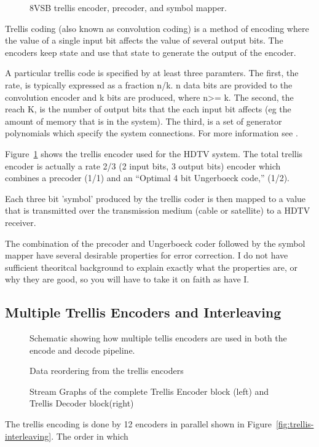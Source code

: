
\begin{figure}
\center
\epsfxsize=5.5in
\caption{8VSB trellis encoder, precoder, and symbol mapper.}
\label{fig:trellis-system}
\end{figure}

Trellis coding (also known as convolution coding) 
is a method of encoding where the value of a single input 
bit affects the value of several output bits. The encoders
keep state and use that state to generate the output of the 
encoder. 

A particular trellis code is 
specified by at least three paramters. The first, the rate, is typically expressed as
a fraction n/k. n data bits are provided to the convolution encoder and k bits are produced,
where n>= k. The second, the reach K, is the number of output bits that the
each input bit affects (eg the amount of memory that is in the system). 
The third, is a set of generator polynomials which specify the system connections.
For more information see \cite{fleming:tutorial}.

Figure~\ref{fig:trellis-system} shows the trellis encoder used for the HDTV system. 
The total trellis encoder is actually a rate 2/3 (2 input bits, 3 output bits) 
encoder which combines a precoder (1/1) and an ``Optimal 4 bit 
Ungerboeck code,'' (1/2).

Each three bit 'symbol' produced by the trellis coder is then mapped to a value
that is transmitted over the transmission medium (cable or satellite) to 
a HDTV receiver. 

The combination of the precoder and Ungerboeck coder followed by the symbol mapper
have several desirable properties for error correction. I do not have sufficient
theoritcal background to explain exactly what the properties are, or why they are good,
so you will have to take it on faith as have I.








\subsection{Multiple Trellis Encoders and Interleaving}

\begin{figure}
\center

\epsfxsize=4.0in
\caption{Schematic showing how multiple tellis encoders are used in both the encode and decode pipeline.}
\label{fig:multiple-trellis}


\epsfxsize=4.0in
\caption{Data reordering from the trellis encoders}
\label{fig:trellis-interleaving}


\epsfxsize=6.0in
\epsfxsize=6.0in
\caption{Stream Graphs of the complete Trellis Encoder block (left) and Trellis Decoder block(right)}
\label{fig:sg-trellis-pipeline}

\end{figure}




The trellis encoding is done by 12 encoders in parallel shown in
Figure~\ref{fig:trellis-interleaving}. The
order in which 
